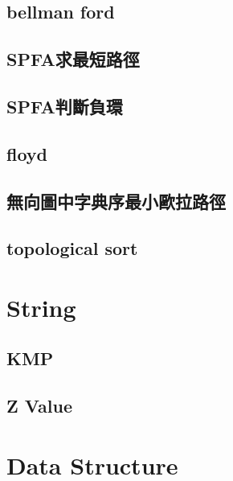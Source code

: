 \documentclass[a4paper,10pt,twocolumn,oneside]{article}
\begin{document}
\subsection{bellman ford}


\subsection{SPFA求最短路徑}


\subsection{SPFA判斷負環}


\subsection{floyd}


\subsection{無向圖中字典序最小歐拉路徑}


\subsection{topological sort}


% 

\section{String}

\subsection{KMP}


\subsection{Z Value}


\section{Data Structure}
\end{document}
